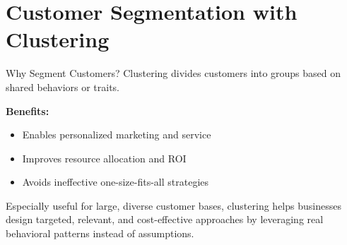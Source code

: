 \documentclass[aspectratio=169, table]{beamer}
\begin{document}
%	
%	


\section{Customer Segmentation with Clustering}

\begin{frame}{Why Segment Customers?}
	Clustering divides customers into groups based on shared behaviors or traits. 
	
	\textbf{Benefits:}
	\begin{itemize}
		\item Enables personalized marketing and service
		\item Improves resource allocation and ROI
		\item Avoids ineffective one-size-fits-all strategies
	\end{itemize}
	
	Especially useful for large, diverse customer bases, clustering helps businesses design targeted, relevant, and cost-effective approaches by leveraging real behavioral patterns instead of assumptions.
\end{frame}
\end{document}
